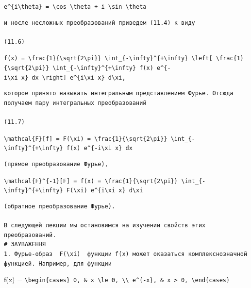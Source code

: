 \documentclass[
  ukrainian,
]{article}
\begin{document}
\texttt{e\^{}\{i\textbackslash{}theta\}\ =\ \textbackslash{}cos\ \textbackslash{}theta\ +\ i\ \textbackslash{}sin\ \textbackslash{}theta}

\begin{verbatim}
и носле несложных преобразований приведем (11.4) к виду

(11.6)
\end{verbatim}

\texttt{f(x)\ =\ \textbackslash{}frac\{1\}\{\textbackslash{}sqrt\{2\textbackslash{}pi\}\}\ \textbackslash{}int\_\{-\textbackslash{}infty\}\^{}\{+\textbackslash{}infty\}\ \textbackslash{}left{[}\ \textbackslash{}frac\{1\}\{\textbackslash{}sqrt\{2\textbackslash{}pi\}\}\ \textbackslash{}int\_\{-\textbackslash{}infty\}\^{}\{+\textbackslash{}infty\}\ f(x)\ e\^{}\{-i\textbackslash{}xi\ x\}\ dx\ \textbackslash{}right{]}\ e\^{}\{i\textbackslash{}xi\ x\}\ d\textbackslash{}xi,}

\begin{verbatim}
которое принято называть интегральным представлением Фурье. Отсюда получаем пару интегральных преобразований

(11.7)
\end{verbatim}

\texttt{\textbackslash{}mathcal\{F\}{[}f{]}\ =\ F(\textbackslash{}xi)\ =\ \textbackslash{}frac\{1\}\{\textbackslash{}sqrt\{2\textbackslash{}pi\}\}\ \textbackslash{}int\_\{-\textbackslash{}infty\}\^{}\{+\textbackslash{}infty\}\ f(x)\ e\^{}\{-i\textbackslash{}xi\ x\}\ dx}

\begin{verbatim}
(прямое преобразование Фурье),
\end{verbatim}

\texttt{\textbackslash{}mathcal\{F\}\^{}\{-1\}{[}F{]}\ =\ f(x)\ =\ \textbackslash{}frac\{1\}\{\textbackslash{}sqrt\{2\textbackslash{}pi\}\}\ \textbackslash{}int\_\{-\textbackslash{}infty\}\^{}\{+\textbackslash{}infty\}\ F(\textbackslash{}xi)\ e\^{}\{i\textbackslash{}xi\ x\}\ d\textbackslash{}xi}

\begin{verbatim}
(обратное преобразование Фурье).

В следующей лекции мы остановимся на изучении свойств этих преобразований.
# ЗАУВАЖЕННЯ
1. Фурье-образ  F(\xi)  функции f(x) может оказаться комплекснозначной функцией. Например, для функции
\end{verbatim}

f(x) =
\texttt{\textbackslash{}begin\{cases\}\ 0,\ \&\ x\ \textbackslash{}le\ 0,\ \textbackslash{}\textbackslash{}\ e\^{}\{-x\},\ \&\ x\ \textgreater{}\ 0,\ \textbackslash{}end\{cases\}}
\end{document}
